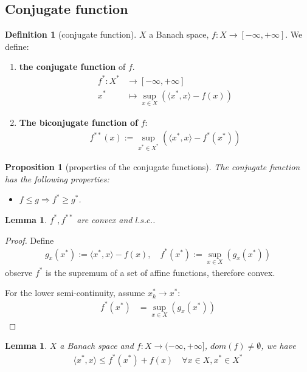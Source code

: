 \documentclass[a4paper,12pt,oneside,fleqn]{book}
\newtheorem{lemma}[theorem]{Lemma}
\newtheorem{proposition}[theorem]{Proposition}
\theoremstyle{definition}
\newtheorem{definition}{Definition}[section]
\theoremstyle{remark}
\begin{document}
\subsection{Conjugate function}
\begin{definition}[conjugate function]
	$X$ a Banach space, $f:X \rightarrow [-\infty, + \infty]$. We define:
	\begin{enumerate}
		\item \textbf{the conjugate function} of $f$.
		\begin{align*}
	       f^*: 	X^* &\rightarrow [-\infty, + \infty]\\
		   x^* &\mapsto \sup_{x \in X}( \langle x^*, x\rangle - f(x) )
	    \end{align*}
		\item \textbf{The biconjugate function of} $f$:
		\begin{align*}
			f^{**}(x):= \sup_{x^* \in X^*} (\langle x^*, x \rangle -f^*(x^*))
		\end{align*}	
	\end{enumerate}
\end{definition}

\begin{proposition}[properties of the conjugate functions]
	The conjugate function has the following properties:
	\begin{itemize}
		\item $f \le g \Rightarrow f^* \ge g^*$.
	\end{itemize}
\end{proposition}

\begin{lemma}
	$f^*, f^{**}$ are convex and $l.s.c.$.
\end{lemma}
\begin{proof}
	Define
	\begin{align*}
		g_x(x^*):= \langle x^*, x \rangle - f(x), \quad
		f^*(x^*):= \sup_{ x \in X}(g_x(x^*))
	\end{align*}
	observe $f^*$ is the supremum of a set of affine functions, therefore convex. \par 
	For the lower semi-continuity, assume $x_k^* \rightarrow x^*$:
	\begin{align*}
		f^*(x^*) &= \sup_{x \in X} (g_x(x^*))
	\end{align*}
\end{proof}

\begin{lemma}
	$X$ a Banach space and $f: X \rightarrow (-\infty, + \infty]$, $dom(f) \neq \emptyset$, we have
	\begin{align*}
		\langle x^*, x \rangle  \le f^*(x^*)+ f(x) \quad \forall x\in X, x^* \in X^*
	\end{align*}
\end{lemma}
\end{document}
